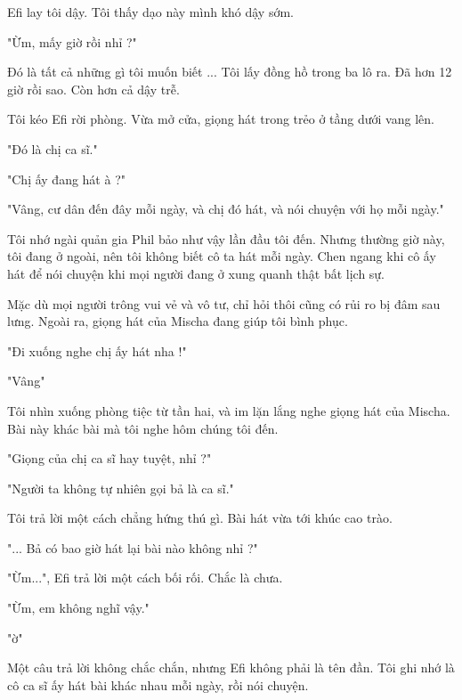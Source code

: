 
Efi lay tôi dậy. Tôi thấy dạo này mình khó dậy sớm.

"Ừm, mấy giờ rồi nhỉ ?"

Đó là tất cả những gì tôi muốn biết ... Tôi lấy đồng hồ trong ba lô ra. Đã hơn 12 giờ rồi sao. Còn hơn cả dậy trễ.

Tôi kéo Efi rời phòng. Vừa mở cửa, giọng hát trong trẻo ở tầng dưới vang lên.

"Đó là chị ca sĩ."

"Chị ấy đang hát à ?"

"Vâng, cư dân đến đây mỗi ngày, và chị đó hát, và nói chuyện với họ mỗi ngày."

Tôi nhớ ngài quản gia Phil bảo như vậy lần đầu tôi đến. Nhưng thường giờ này, tôi đang ở ngoài, nên tôi không biết cô ta hát mỗi ngày. Chen ngang khi cô ấy hát để nói chuyện khi mọi người đang ở xung quanh thật bất lịch sự. 

Mặc dù mọi người trông vui vẻ và vô tư, chỉ hỏi thôi cũng có rủi ro bị đâm sau lưng. Ngoài ra, giọng hát của Mischa đang giúp tôi bình phục.

"Đi xuống nghe chị ấy hát nha !"

"Vâng"

Tôi nhìn xuống phòng tiệc từ tần hai, và im lặn lắng nghe giọng hát của Mischa. Bài này khác bài mà tôi nghe hôm chúng tôi đến.

"Giọng của chị ca sĩ hay tuyệt, nhỉ ?"

"Người ta không tự nhiên gọi bả là ca sĩ."

Tôi trả lời một cách chẳng hứng thú gì. Bài hát vừa tới khúc cao trào.

"... Bả có bao giờ hát lại bài nào không nhỉ ?"

"Ừm...", Efi trả lời một cách bối rối. Chắc là chưa.

"Ừm, em không nghĩ vậy."

"ờ"

Một câu trả lời không chắc chắn, nhưng Efi không phải là tên đần. Tôi ghi nhớ là cô ca sĩ ấy hát bài khác nhau mỗi ngày, rồi nói chuyện. \\

